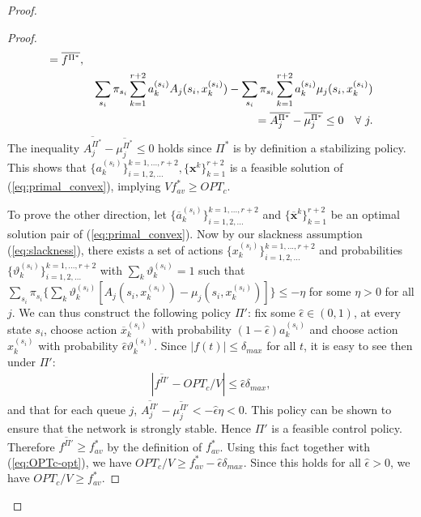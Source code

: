 \documentclass[journal]{IEEEtran}
\newcommand{\bv}[1]{{\boldsymbol{#1} }}
\newcommand{\script}[1]{{{\cal{#1} }}}
\begin{document}
\begin{proof}
\begin{proof}
\begin{eqnarray*}
 = \overline{f^{\Pi^*}},\\
\hspace{-.3in}&&\sum_{s_i}\pi_{s_i}\sum_{k=1}^{r+2}a^{(s_i)}_kA_j(s_i, x^{(s_i)}_k)-\sum_{s_i}\pi_{s_i}\sum_{k=1}^{r+2}a^{(s_i)}_k\mu_j(s_i, x^{(s_i)}_k)\\
 \hspace{-.3in}&&\qquad\qquad\qquad\qquad\qquad\qquad=\overline{A^{\Pi^*}_j}-\overline{\mu^{\Pi^*}_j}\leq 0 \quad\forall\,\, j. 
\end{eqnarray*}
The inequality $\overline{A^{\Pi^*}_j}-\overline{\mu^{\Pi^*}_j}\leq 0$ holds since $\Pi^*$ is by definition a stabilizing policy. This shows that $\{a^{(s_i)}_k\}_{i=1, 2, ...}^{k=1,..., r+2}, \{\bv{x}^k\}_{k=1}^{r+2}$ is a feasible solution of (\ref{eq:primal_convex}), implying $Vf_{av}^*\geq OPT_c$. 


To prove the other direction, let $\{\overline{a}^{(s_i)}_k\}^{k=1, ..., r+2}_{i=1, 2, ...}$ and $\{\overline{\bv{x}}^{k}\}_{k=1}^{r+2}$ be an optimal solution pair of (\ref{eq:primal_convex}). Now by our slackness assumption (\ref{eq:slackness}), there exists a set of actions $\{x^{(s_i)}_k\}_{i=1, 2, ...}^{k=1, ..., r+2}$ and probabilities $\{\vartheta^{(s_i)}_k\}_{i=1, 2, ...}^{k=1, ..., r+2}$ with $\sum_k\vartheta^{(s_i)}_k=1$ such that $\sum_{s_i}\pi_{s_i}\big\{\sum_k\vartheta^{(s_i)}_k[A_{j}(s_i, x^{(s_i)}_k)-\mu_{j}(s_i, x^{(s_i)}_k)]\big\}\leq -\eta$ for some $\eta>0$ for all $j$. We can thus construct the following policy $\Pi'$: fix some $\hat{\epsilon}\in(0, 1)$, at every state $s_i$, choose action $\overline{x}^{(s_i)}_k$ with probability $(1-\hat{\epsilon})a^{(s_i)}_k$ and choose action $x^{(s_i)}_k$ with probability $\hat{\epsilon}\vartheta^{(s_i)}_k$. 
Since $|f(t)|\leq\delta_{max}$ for all $t$, it is easy to see then under $\Pi'$: 
\begin{eqnarray}
|\overline{f^{\Pi'}} - OPT_c/V|\leq\hat{\epsilon}\delta_{max}, \label{eq:OPTc-opt}
\end{eqnarray}
and that for each queue $j$, $\overline{A^{\Pi'}_j}-\overline{\mu^{\Pi'}_j}<-\hat{\epsilon}\eta<0$. This policy can be shown to ensure that the network is strongly stable. Hence $\Pi'$ is a feasible control policy. Therefore $\overline{f^{\Pi'}}\geq f_{av}^*$ by the definition of $f_{av}^*$. Using this fact together with (\ref{eq:OPTc-opt}), we have $OPT_c/V\geq f_{av}^*-\hat{\epsilon}\delta_{max}$. Since this holds for all $\hat{\epsilon}>0$, we have $OPT_c/V\geq f_{av}^*$.
\end{proof}


\end{proof}
\end{document}
